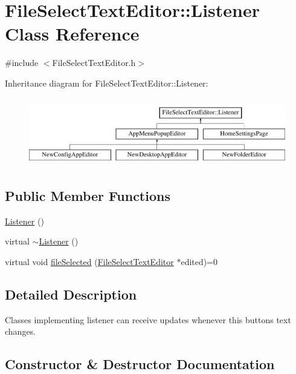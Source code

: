 \hypertarget{classFileSelectTextEditor_1_1Listener}{}\section{File\+Select\+Text\+Editor\+:\+:Listener Class Reference}
\label{classFileSelectTextEditor_1_1Listener}


{\ttfamily \#include $<$File\+Select\+Text\+Editor.\+h$>$}

Inheritance diagram for File\+Select\+Text\+Editor\+:\+:Listener\+:\begin{figure}[H]
\begin{center}
\leavevmode
\includegraphics[height=3.000000cm]{classFileSelectTextEditor_1_1Listener}
\end{center}
\end{figure}
\subsection*{Public Member Functions}
\begin{DoxyCompactItemize}
\item 
\mbox{\hyperlink{classFileSelectTextEditor_1_1Listener_a9259382f71c5b48a5484716af68cc10b}{Listener}} ()
\item 
virtual \mbox{\hyperlink{classFileSelectTextEditor_1_1Listener_ae9d9c07221169ca0cd01496f83a1f84a}{$\sim$\+Listener}} ()
\item 
virtual void \mbox{\hyperlink{classFileSelectTextEditor_1_1Listener_a1f87de46005423ad8b12e4a9bc379753}{file\+Selected}} (\mbox{\hyperlink{classFileSelectTextEditor}{File\+Select\+Text\+Editor}} $\ast$edited)=0
\end{DoxyCompactItemize}


\subsection{Detailed Description}
Classes implementing listener can receive updates whenever this button\textquotesingle{}s text changes. 

\subsection{Constructor \& Destructor Documentation}
\mbox{\label{classFileSelectTextEditor_1_1Listener_a9259382f71c5b48a5484716af68cc10b}} 
